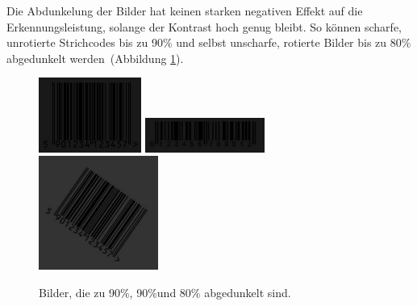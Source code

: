 Die Abdunkelung der Bilder hat keinen starken negativen Effekt auf die Erkennungsleistung, solange der Kontrast hoch genug bleibt. So können scharfe, unrotierte Strichcodes bis zu 90\% und selbst unscharfe, rotierte Bilder bis zu 80\% abgedunkelt werden~(Abbildung \ref{fig:eandark}).
\begin{figure}[H]
  \centering
  \includegraphics[width=0.30\textwidth]{img/EAN13/dark_01_90.jpg}
  \includegraphics[width=0.35\textwidth]{img/EAN13/dark_02_90.jpg}
  \includegraphics[width=0.35\textwidth]{img/EAN13/blurrydarkrotate_01_07_80_35.jpg}
  \caption{Bilder, die zu 90\%, 90\%und 80\% abgedunkelt sind.}
  \label{fig:eandark}
\end{figure}

